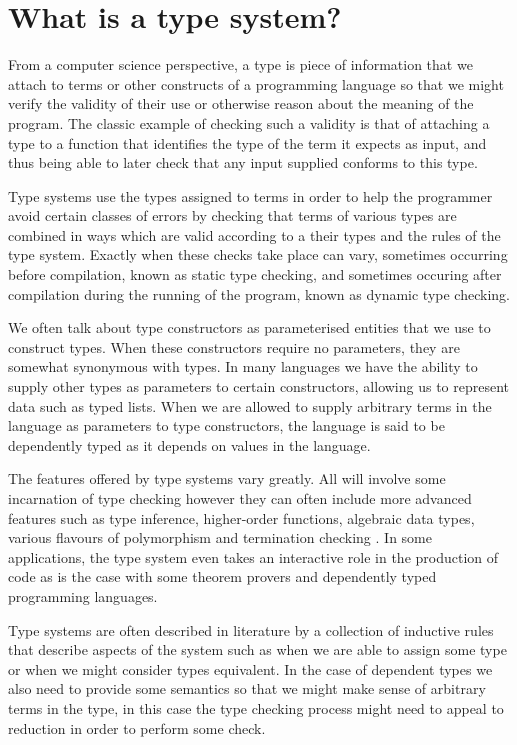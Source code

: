 \chapter{What is a type system?}

From a computer science perspective, a type is piece of information
that we attach to terms or other constructs of a programming language
so that we might verify the validity of their use or otherwise reason
about the meaning of the program. The classic example of checking such
a validity is that of attaching a type to a function that identifies
the type of the term it expects as input, and thus being able to later
check that any input supplied conforms to this type.

Type systems use the types assigned to terms in order to help the
programmer avoid certain classes of errors by checking that terms of
various types are combined in ways which are valid according to a
their types and the rules of the type system. Exactly when these
checks take place can vary, sometimes occurring before compilation,
known as static type checking, and sometimes occuring after
compilation during the running of the program, known as dynamic type
checking.

We often talk about type constructors as parameterised entities that
we use to construct types. When these constructors require no
parameters, they are somewhat synonymous with types. In many languages
we have the ability to supply other types as parameters to certain
constructors, allowing us to represent data such as typed lists. When
we are allowed to supply arbitrary terms in the language as
parameters to type constructors, the language is said to be
dependently typed as it depends on values in the language.

The features offered by type systems vary greatly. All will involve
some incarnation of type checking however they can often include
more advanced features such as type inference, higher-order functions,
algebraic data types, various flavours of polymorphism and termination
checking \cite{Abel_2004}. In some applications, the type system even
takes an interactive role in the production of code as is the case
with some theorem provers and dependently typed programming languages. 

Type systems are often described in literature by a collection of
inductive rules that describe aspects of the system such as when we
are able to assign some type or when we might consider types
equivalent. In the case of dependent types we also need to provide
some semantics so that we might make sense of arbitrary terms in the
type, in this case the type checking process might need to appeal to
reduction in order to perform some check.
